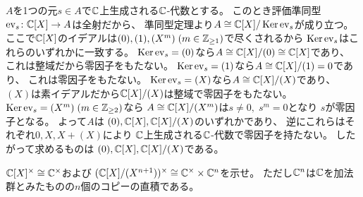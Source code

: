 \documentclass[report]{jlreq}
\begin{document}
\begin{answer}
    $A$を1つの元$s \in A$で$\mathbb{C}$上生成される$\mathbb{C}$-代数とする。
    このとき評価準同型$\mathrm{ev}_s \colon \mathbb{C}[X] \to A$は全射だから、
    準同型定理より$A \cong \mathbb{C}[X] / \operatorname{\mathrm{Ker}} \mathrm{ev}_s$が成り立つ。
    ここで$\mathbb{C}[X]$のイデアルは$(0), (1), (X^m) \; (m \in \mathbb{Z}_{\ge 1})$で尽くされるから
    $\operatorname{\mathrm{Ker}} \mathrm{ev}_s$はこれらのいずれかに一致する。
    $\operatorname{\mathrm{Ker}} \mathrm{ev}_s = (0)$なら$A \cong \mathbb{C}[X] / (0) \cong \mathbb{C}[X]$であり、
    これは整域だから零因子をもたない。
    $\operatorname{\mathrm{Ker}} \mathrm{ev}_s = (1)$なら$A \cong \mathbb{C}[X] / (1) = 0$であり、
    これは零因子をもたない。
    $\operatorname{\mathrm{Ker}} \mathrm{ev}_s = (X)$なら$A \cong \mathbb{C}[X] / (X)$であり、
    $(X)$は素イデアルだから$\mathbb{C}[X] / (X)$は整域で零因子をもたない。
    $\operatorname{\mathrm{Ker}} \mathrm{ev}_s = (X^m) \; (m \in \mathbb{Z}_{\ge 2})$なら
    $A \cong \mathbb{C}[X] / (X^m)$は$s \neq 0, \; s^m = 0$となり
    $s$が零因子となる。
    よって$A$は
    $(0), \mathbb{C}[X], \mathbb{C}[X] / (X)$のいずれかであり、
    逆にこれらはそれぞれ$0, X, X + (X)$により
    $\mathbb{C}$上生成される$\mathbb{C}$-代数で零因子を持たない。
    したがって求めるものは
    $(0), \mathbb{C}[X], \mathbb{C}[X] / (X)$である。
\end{answer}


\begin{problem}[代数学II 2.28]
    $\mathbb{C}[X]^\times \cong \mathbb{C}^\times$および
    $(\mathbb{C}[X] / (X^{n + 1}))^\times \cong \mathbb{C}^\times \times \mathbb{C}^n$を示せ。
    ただし$\mathbb{C}^n$は$\mathbb{C}$を加法群とみたものの$n$個のコピーの直積である。
\end{problem}

\begin{answer}
    \TODO{}
\end{answer}


\end{document}
